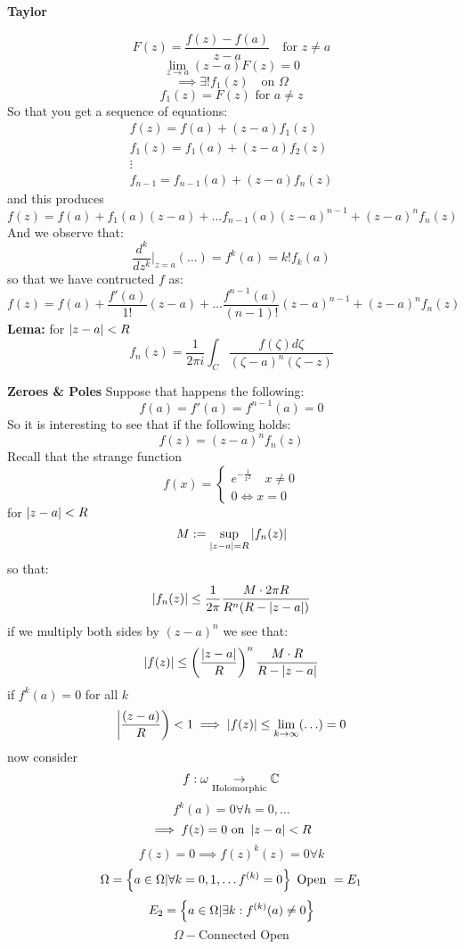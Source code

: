 \textbf{Taylor}

\[ F(z) = \frac{f(z) - f(a)}{z-a} \quad \textrm{for } z \neq a \]
\[ \lim_{z \rightarrow a}(z-a) F(z) = 0 \]
\[ \implies \exists! f_1(z) \quad \textrm{on } \Omega \]
\[ f_1(z) = F(z) \textrm{ for } a \neq z \]
So that you get a sequence of equations:
\begin{align*}
f(z) = f(a) + (z-a)f_1(z) \\
f_1(z) = f_1(a) + (z-a)f_2(z) \\
\vdots \\
f_{n-1} = f_{n-1}(a) + (z-a)f_n(z)
\end{align*}
and this produces 
\[ f(z) = f(a) + f_1(a)(z-a) + \ldots f_{n-1}(a) (z-a)^{n-1}+ (z-a)^n f_n(z) \]
And we observe that:
\[ \dfrac{d^k}{dz^k} \vert_{z=a}(\ldots) = f^{k}(a) = k!f_k(a) \]
so that we have contructed $ f $ as:
\[ f(z) = f(a) + \dfrac{f'(a)}{1!}(z-a) + \ldots \dfrac{f^{n-1}(a)}{(n-1)!}(z-a)^{n-1} + (z-a)^nf_n(z) \]
\textbf{Lema:} for $ \left| z-a \right| < R $
\[ f_n(z) = \dfrac{1}{2\pi i} \int_{C} \frac{f(\zeta)d\zeta}{(\zeta -a)^n(\zeta - z)} \]

\textbf{Zeroes \& Poles}
Suppose that happens the following:
\[ f(a) = f'(a) = f^{n-1}(a) = 0 \]
So it is interesting to see that if the following holds:
\[ f(z) = (z-a)^n f_n(z) \]
Recall that the strange function
\[ f(x) = \begin{cases}
e^{-\frac{1}{x^{2}}} \quad x \neq 0 \\
0 \iff x = 0
\end{cases} \]
for $ \left| z-a \right| < R $
\[ M := \sup_{\left| z-a \right| = R} \left| f_n(z) \right| \]
so that:
\[ \left| f_n(z)  \right| \leq \frac{1}{2 \pi} \frac{M \cdot 2 \pi R}{R^n (R - \left| z-a \right|)} \]
if we multiply both sides by $ (z-a)^n $ we see that:
\[ \left| f(z) \right| \leq \left( \frac{\left| z-a \right|}{R} \right) ^n \frac{M \cdot R}{R - \left| z-a \right|} \]
if $ f^k (a) = 0 $ for all $ k $
\[ \left| \dfrac{(z-a)}{R} \right) < 1 \implies \left| f(z) \right| \leq \lim_{k \rightarrow \infty} (\ldots) = 0 \]
now consider
\[ f: \omega \underset{\textrm{Holomorphic}}{\rightarrow} \mathbb{C} \]
\[ f^k(a) = 0 \forall h = 0, \ldots \]
\[ \implies f(z) = 0 \textrm{ on } \left| z-a \right| < R \]
\[ f(z) = 0 \implies f(z)^k (z) = 0 \forall k \]
\[ \Omega = \left\lbrace a \in \Omega | \forall k = 0,1, \ldots f^{(k)} = 0  \right\rbrace \textrm{ Open } = E_1 \]
\[ E_2 = \left\lbrace a \in \Omega | \exists k : f^{(k)}(a) \neq 0 \right\rbrace \]
\[ \Omega- \textrm{Connected Open} \]
